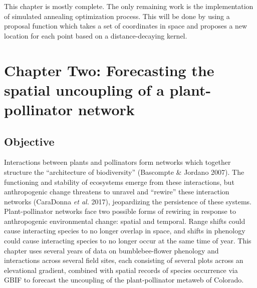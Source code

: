 \documentclass[11pt]{article}
\begin{document}
This chapter is mostly complete. The only remaining work is the
implementation of simulated annealing optimization process. This will be
done by using a proposal function which takes a set of coordinates in
space and proposes a new location for each point based on a
distance-decaying kernel.

\hypertarget{chapter-two-forecasting-the-spatial-uncoupling-of-a-plant-pollinator-network}{%
\section{Chapter Two: Forecasting the spatial uncoupling of a
plant-pollinator
network}\label{chapter-two-forecasting-the-spatial-uncoupling-of-a-plant-pollinator-network}}

\hypertarget{objective-1}{%
\subsection{Objective}\label{objective-1}}

Interactions between plants and pollinators form networks which together
structure the ``architecture of biodiversity'' (Bascompte \& Jordano
2007). The functioning and stability of ecosystems emerge from these
interactions, but anthropogenic change threatens to unravel and
``rewire'' these interaction networks (CaraDonna \emph{et al.} 2017),
jeopardizing the persistence of these systems. Plant-pollinator networks
face two possible forms of rewiring in response to anthropogenic
environmental change: spatial and temporal. Range shifts could cause
interacting species to no longer overlap in space, and shifts in
phenology could cause interacting species to no longer occur at the same
time of year. This chapter uses several years of data on
bumblebee-flower phenology and interactions across several field sites,
each consisting of several plots across an elevational gradient,
combined with spatial records of species occurrence via GBIF to forecast
the uncoupling of the plant-pollinator metaweb of Colorado.
\end{document}
